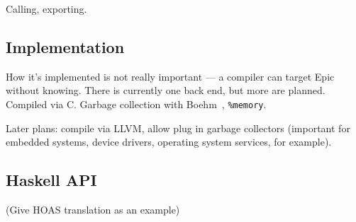 Calling, exporting.

\subsection{Implementation}

How it's implemented is not really important --- a compiler can target
Epic without knowing. There is currently one back end, but more are
planned. Compiled via C. Garbage collection with
Boehm~\cite{boehm-gc}, \texttt{\%memory}.

Later plans: compile via LLVM, allow plug in garbage collectors
(important for embedded systems, device drivers, operating system
services, for example).

\subsection{Haskell API}

(Give HOAS translation as an example)
